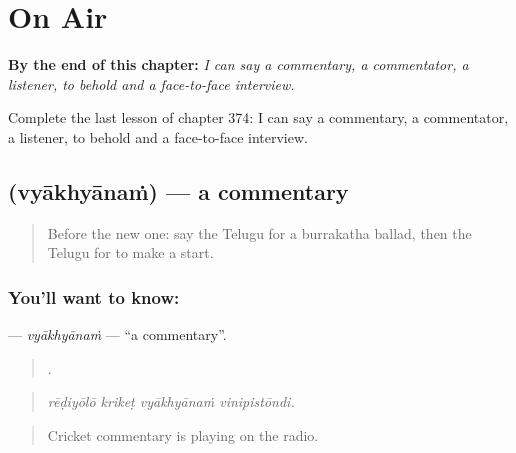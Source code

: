 
\chapter{On Air}
\label{ch:te-on-air}

\begin{chapteropening}
\textbf{By the end of this chapter:} \emph{I can say a commentary, a commentator, a listener, to behold and a face-to-face interview.}

Complete the last lesson of chapter 374: I can say a commentary, a commentator, a listener, to behold and a face-to-face interview.
\end{chapteropening}

\section[\texorpdfstring{\te{వ్యాఖ్యానం} (vyākhyānaṁ)}{వ్యాఖ్యానం (vyākhyānaṁ)}]{ (vyākhyānaṁ) — a commentary}

\label{lesson:TE-C374-vyakhyanam}



\begin{quote}
Before the new one: say the Telugu for a burrakatha ballad, then the Telugu for to make a start.
\end{quote}

\subsection*{You'll want to know: }
\textbf{} — \emph{vyākhyānaṁ} — \textquotedblleft{}a commentary\textquotedblright{}.

\begin{quote}
   .
\end{quote}

\begin{quote}
\emph{rēḍiyōlō krikeṭ vyākhyānaṁ vinipistōndi.}
\end{quote}

\begin{quote}
Cricket commentary is playing on the radio.
\end{quote}

